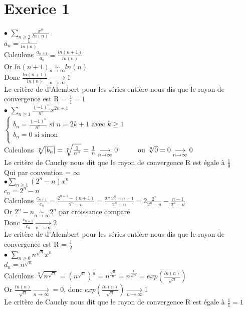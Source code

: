 \documentclass{article}
\author{Frederic Becerril}
\newcommand\tab[1][1cm]{\hspace*{#1}}
\begin{document}
\part*{Exerice 1}

$\bullet$ $\sum_{n \geq 2} \frac{x^n}{ln(n)}$\\
$a_n = \frac{1}{ln(n)}$\\
Calculons $\frac{a_{n+1}}{a_n} = \frac{ln(n+1)}{ln(n)}$\\
Or $ln(n + 1) \underset{n \rightarrow \infty}{\sim} ln(n)$\\
Donc $\frac{ln(n+1)}{ln(n)} \underset{n \rightarrow \infty}{\rightarrow} 1$\\
Le critère de d'Alembert pour les séries entière nous dis que le rayon de convergence est R = $\frac{1}{1} = 1$\\
$\bullet$ $\sum_{n \geq 1} \frac{(-1)^n}{n^n} x^{2n + 1}$\\
$\left\{
    \begin{array}{ll}
        b_n = \frac{(-1)^n}{n^n} \mbox{ si } n = 2k + 1 \mbox{ avec } k \geq 1\\
        b_n = 0 \mbox{ si sinon}\\
    \end{array}
\right.$\\
Calculons $\sqrt[n]{|b_n|} = \sqrt[n]{\frac{1}{n^n}} = \frac{1}{n} \underset{n \rightarrow \infty}{\longrightarrow} 0 \tab \mbox{ou } \sqrt[n]{0} = 0\underset{n \rightarrow \infty}{\longrightarrow} 0$\\
Le critère de Cauchy nous dit que le rayon de convergence R est égale à $\frac{1}{0}$\\
Qui par convention = $\infty$\\
$\bullet \sum_{n \geq 1} (2^n - n)x^n$\\
$c_n = 2^n - n$\\
Calculons $\frac{c_{n+1}}{c_n} = \frac{2^{n + 1} - (n + 1)}{2^n - n} = \frac{2 * 2^n -n + 1}{2^n - n} = 2\frac{2^n}{2^n - n} - \frac{n - 1}{2^n - n}$\\
Or $2^n - n \underset{n \rightarrow \infty}{\sim} 2^n$ par croissance comparé\\
Donc $\frac{c_{n+1}}{c_n} \underset{n \rightarrow \infty}{\longrightarrow} 2$\\
Le critère de d'Alembert pour les séries entière nous dis que le rayon de convergence est R = $\frac{1}{2}$\\
$\bullet$ $\sum_{n \geq 0} n^{\sqrt{n}} x^n$\\
$d_n = n^{\sqrt{n}}$\\
Calculons $\sqrt[n]{n^{\sqrt{n}}} = (n^{\sqrt{n}})^{\frac{1}{n}} = n^{\frac{\sqrt{n}}{n}} = n^{\frac{1}{\sqrt{n}}} = exp(\frac{ln(n)}{\sqrt{n}})$\\
Or $\frac{ln(n)}{\sqrt{n}} \underset{n \rightarrow \infty}{\longrightarrow} = 0$, donc $exp(\frac{ln(n)}{\sqrt{n}}) \underset{n \rightarrow \infty}{\longrightarrow} 1$\\ 
Le critère de Cauchy nous dit que le rayon de convergence R est égale à $\frac{1}{1} = 1$\\
\newpage
\end{document}
